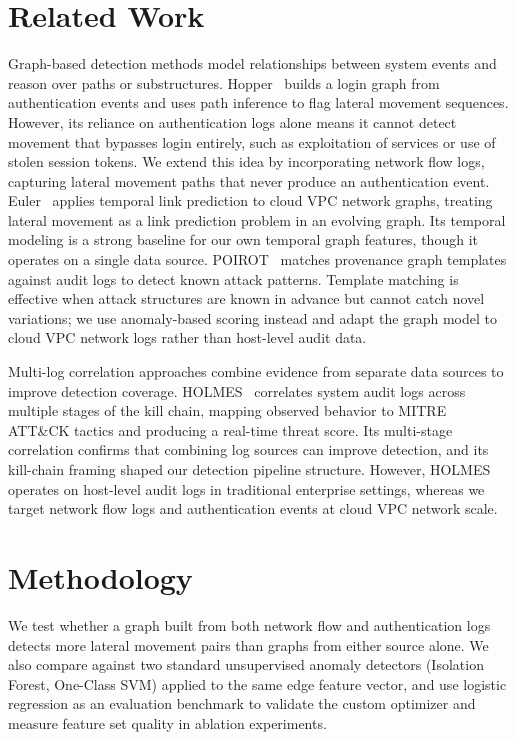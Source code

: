 \documentclass[letterpaper,twocolumn,10pt]{article}
\begin{document}
\section{Related Work}



Graph-based detection methods model relationships between system events and reason over paths or substructures. Hopper~\cite{hopper2021} builds a login graph from authentication events and uses path inference to flag lateral movement sequences. However, its reliance on authentication logs alone means it cannot detect movement that bypasses login entirely, such as exploitation of services or use of stolen session tokens. We extend this idea by incorporating network flow logs, capturing lateral movement paths that never produce an authentication event. Euler~\cite{euler2023} applies temporal link prediction to cloud VPC network graphs, treating lateral movement as a link prediction problem in an evolving graph. Its temporal modeling is a strong baseline for our own temporal graph features, though it operates on a single data source. POIROT~\cite{poirot2019} matches provenance graph templates against audit logs to detect known attack patterns. Template matching is effective when attack structures are known in advance but cannot catch novel variations; we use anomaly-based scoring instead and adapt the graph model to cloud VPC network logs rather than host-level audit data.

Multi-log correlation approaches combine evidence from separate data sources to improve detection coverage. HOLMES~\cite{holmes2019} correlates system audit logs across multiple stages of the kill chain, mapping observed behavior to MITRE ATT\&CK tactics and producing a real-time threat score. Its multi-stage correlation confirms that combining log sources can improve detection, and its kill-chain framing shaped our detection pipeline structure. However, HOLMES operates on host-level audit logs in traditional enterprise settings, whereas we target network flow logs and authentication events at cloud VPC network scale.

\section{Methodology}

We test whether a graph built from both network flow and authentication logs detects more lateral movement pairs than graphs from either source alone. We also compare against two standard unsupervised anomaly detectors (Isolation Forest, One-Class SVM) applied to the same edge feature vector, and use logistic regression as an evaluation benchmark to validate the custom optimizer and measure feature set quality in ablation experiments.
\end{document}

